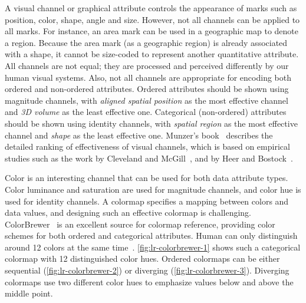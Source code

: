 

A visual channel or graphical attribute controls the appearance of marks such as position, color, shape, angle and size. However, not all channels can be applied to all marks. For instance, an area mark can be used in a geographic map to denote a region. Because the area mark (as a geographic region) is already associated with a shape, it cannot be size-coded to represent another quantitative attribute. 
All channels are not equal; they are processed and perceived differently by our human visual systems. Also, not all channels are appropriate for encoding both ordered and non-ordered attributes. Ordered attributes should be shown using magnitude channels, with \emph{aligned spatial position} as the most effective channel and \emph{3D volume} as the least effective one. Categorical (non-ordered) attributes should be shown using identity channels, with \emph{spatial region} as the most effective channel and \emph{shape} as the least effective one. Munzer's book~\cite{Munzner2014} describes the detailed ranking of effectiveness of visual channels, which is based on empirical studies such as the work by Cleveland and McGill~\cite{Cleveland1985}, and by Heer and Bostock~\cite{Heer2010a}.

Color is an interesting channel that can be used for both data attribute types. Color luminance and saturation are used for magnitude channels, and color hue is used for identity channels. A colormap specifies a mapping between colors and data values, and designing such an effective colormap is challenging. ColorBrewer~\cite{Harrower2003} is an excellent source for colormap reference, providing color schemes for both ordered and categorical attributes. Human can only distinguish around 12 colors at the same time~\cite{Munzner2014}. \autoref{fig:lr-colorbrewer-1} shows such a categorical colormap with 12 distinguished color hues. Ordered colormaps can be either sequential (\autoref{fig:lr-colorbrewer-2}) or diverging (\autoref{fig:lr-colorbrewer-3}). Diverging colormaps use two different color hues to emphasize values below and above the middle point.


